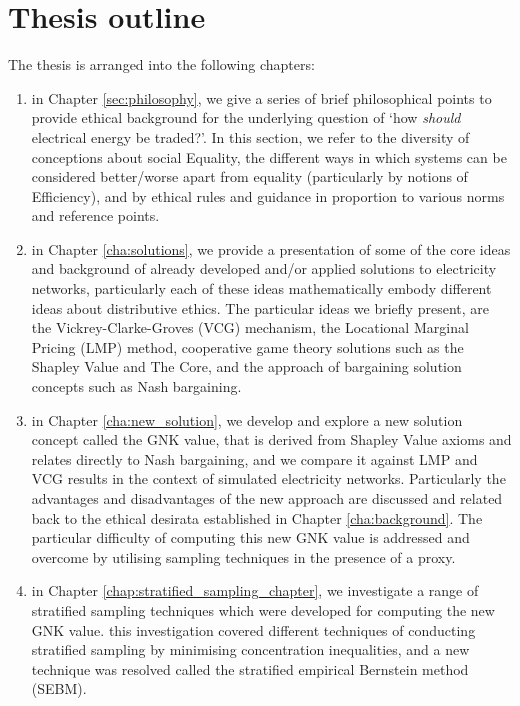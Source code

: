 \section{Thesis outline}
The thesis is arranged into the following chapters:
\begin{enumerate}
\item in Chapter \ref{sec:philosophy}, we give a series of brief philosophical points to provide ethical background for the underlying question of `how \textit{should} electrical energy be traded?'. In this section, we refer to the diversity of conceptions about social Equality, the different ways in which systems can be considered better/worse apart from equality (particularly by notions of Efficiency), and by ethical rules and guidance in proportion to various norms and reference points. 
\item in Chapter \ref{cha:solutions}, we provide a presentation of some of the core ideas and background of already developed and/or applied solutions to electricity networks, particularly each of these ideas mathematically embody different ideas about distributive ethics. The particular ideas we briefly present, are the Vickrey-Clarke-Groves (VCG) mechanism, the Locational Marginal Pricing (LMP) method, cooperative game theory solutions such as the Shapley Value and The Core, and the approach of bargaining solution concepts such as Nash bargaining. 
\item in Chapter \ref{cha:new_solution}, we develop and explore a new solution concept called the GNK value, that is derived from Shapley Value axioms and relates directly to Nash bargaining, and we compare it against LMP and VCG results in the context of simulated electricity networks. Particularly the advantages and disadvantages of the new approach are discussed and related back to the ethical desirata established in Chapter \ref{cha:background}. The particular difficulty of computing this new GNK value is addressed and overcome by utilising sampling techniques in the presence of a proxy.
\item in Chapter \ref{chap:stratified_sampling_chapter}, we investigate a range of stratified sampling techniques which were developed for computing the new GNK value. this investigation covered different techniques of conducting stratified sampling by minimising concentration inequalities, and a new technique was resolved called the stratified empirical Bernstein method (SEBM).
\end{enumerate}




